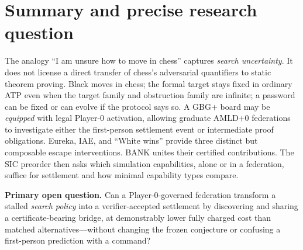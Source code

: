 \documentclass[11pt,letterpaper]{article}
\begin{document}
\section{Summary and precise research question}
The analogy ``I am unsure how to move in chess'' captures \emph{search uncertainty}. It does not license a direct transfer of chess's adversarial quantifiers to static theorem proving. Black moves in chess; the formal target stays fixed in ordinary ATP even when the target family and obstruction family are infinite; a password can be fixed or can evolve if the protocol says so. A GBG+ board may be \emph{equipped} with legal Player-0 activation, allowing graduate AMLD+0 federations to investigate either the first-person settlement event or intermediate proof obligations. Eureka, IAE, and ``White wins'' provide three distinct but composable escape interventions. BANK unites their certified contributions. The SIC preorder then asks which simulation capabilities, alone or in a federation, suffice for settlement and how minimal capability types compare.

\noindent\colorbox{pale}{\parbox{0.95\linewidth}{\textbf{Primary open question.} Can a Player-0-governed federation transform a stalled \emph{search policy} into a verifier-accepted settlement by discovering and sharing a certificate-bearing bridge, at demonstrably lower fully charged cost than matched alternatives---without changing the frozen conjecture or confusing a first-person prediction with a command?}}
\end{document}
